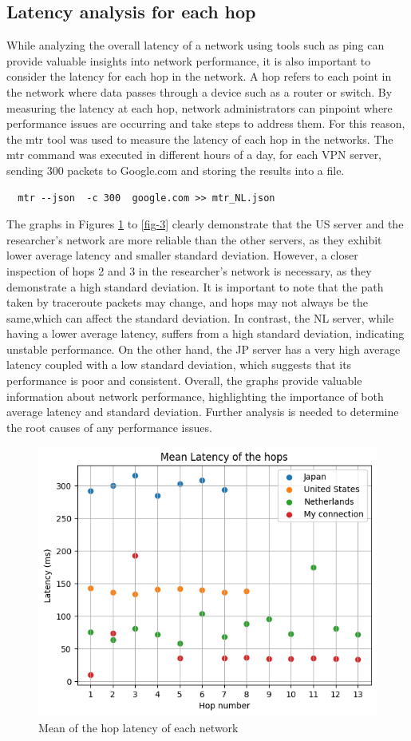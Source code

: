 \documentclass[eng]{class}
\begin{document}
\subsection{Latency analysis for each hop}
While analyzing the overall latency of a network using tools such as ping can provide valuable insights into network performance,
it is also important to consider the latency for each hop in the network.
A hop refers to each point in the network where data passes through a device such as a router or switch. By measuring the latency at each hop,
network administrators can pinpoint where performance issues are occurring and take steps to address them.
For this reason, the mtr tool was used to measure the latency of each hop in the networks.
The mtr command was executed in different hours of a day, for each VPN server, sending 300 packets to Google.com and storing the results into a file.
\begin{lstlisting}
  mtr --json  -c 300  google.com >> mtr_NL.json
\end{lstlisting}
The graphs in Figures \ref{fig-2} to \ref{fig-3} clearly demonstrate that the US server and the researcher's network are more reliable than the other servers,
as they exhibit lower average latency and smaller standard deviation. However, a closer inspection of hops 2 and 3 in the researcher's network is necessary,
as they demonstrate a high standard deviation.
It is important to note that the path taken by traceroute packets may change, and hops may not always be the same,which can affect the standard deviation.
In contrast, the NL server, while having a lower average latency, suffers from a high standard deviation, indicating unstable performance.
On the other hand, the JP server has a very high average latency coupled with a low standard deviation, which suggests that its performance is poor and consistent.
Overall, the graphs provide valuable information about network performance, highlighting the importance of both average latency and standard deviation.
Further analysis is needed to determine the root causes of any performance issues.
\begin{figure}[H]
  \centering
  \includegraphics[width=.7\columnwidth]{images/meanLHops.png}
  \caption{Mean of the hop latency of each network}
  \label{fig-2}
\end{figure}
\end{document}
